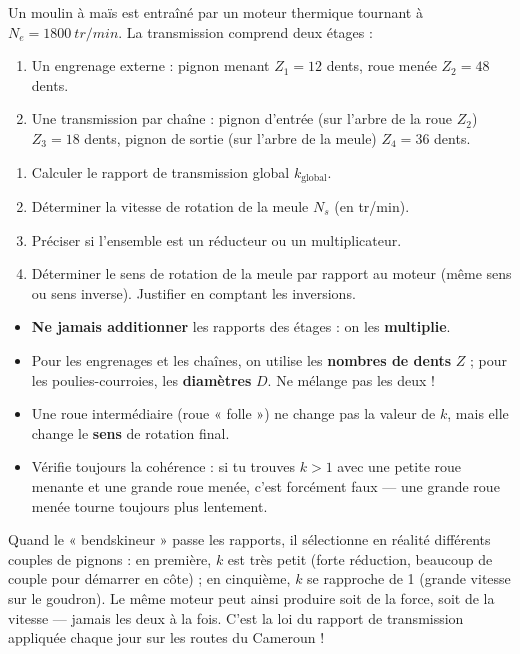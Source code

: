 \documentclass[11pt]{article}
\begin{document}
\begin{exercice}
Un moulin à maïs est entraîné par un moteur thermique tournant à $N_e = \SI{1800}{tr/min}$. La transmission comprend deux étages :
\begin{enumerate}
\item Un engrenage externe : pignon menant $Z_1 = 12$ dents, roue menée $Z_2 = 48$ dents.
\item Une transmission par chaîne : pignon d'entrée (sur l'arbre de la roue $Z_2$) $Z_3 = 18$ dents, pignon de sortie (sur l'arbre de la meule) $Z_4 = 36$ dents.
\end{enumerate}
\begin{enumerate}
\item Calculer le rapport de transmission global $k_{\text{global}}$.
\item Déterminer la vitesse de rotation de la meule $N_s$ (en tr/min).
\item Préciser si l'ensemble est un réducteur ou un multiplicateur.
\item Déterminer le sens de rotation de la meule par rapport au moteur (même sens ou sens inverse). Justifier en comptant les inversions.
\end{enumerate}
\end{exercice}

\begin{attention}
\begin{itemize}
\item \textbf{Ne jamais additionner} les rapports des étages : on les \textbf{multiplie}.
\item Pour les engrenages et les chaînes, on utilise les \textbf{nombres de dents} $Z$ ; pour les poulies-courroies, les \textbf{diamètres} $D$. Ne mélange pas les deux !
\item Une roue intermédiaire (roue « folle ») ne change pas la valeur de $k$, mais elle change le \textbf{sens} de rotation final.
\item Vérifie toujours la cohérence : si tu trouves $k > 1$ avec une petite roue menante et une grande roue menée, c'est forcément faux — une grande roue menée tourne toujours plus lentement.
\end{itemize}
\end{attention}

\begin{savaistu}
Quand le « bendskineur » passe les rapports, il sélectionne en réalité différents couples de pignons : en première, $k$ est très petit (forte réduction, beaucoup de couple pour démarrer en côte) ; en cinquième, $k$ se rapproche de 1 (grande vitesse sur le goudron). Le même moteur peut ainsi produire soit de la force, soit de la vitesse — jamais les deux à la fois. C'est la loi du rapport de transmission appliquée chaque jour sur les routes du Cameroun !
\end{savaistu}
\end{document}

